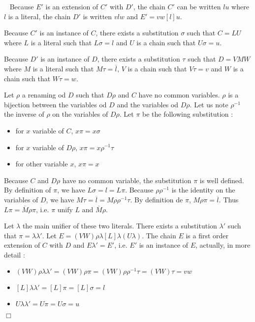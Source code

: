 \documentclass{article}
\newenvironment{preuve}{\noindent {\em Proof :}\ }{{\hfill
    $\Box$}\vspace{.5pc}} \newcommand{\sg}{\!\!<\!\!}
\begin{document}
\begin{preuve}
Because $E'$ is an extension of $C'$ with $D'$, the chain $C'$ can be written $lu$ where $l$ is a literal, the chain $D'$ is
written $vlw$ and $E'=vw[l]u$.

Because $C'$ is an instance of $C$, there exists a substitution $\sigma$ such that $C=LU$ where $L$ is a literal such that
$L\sigma=l$ and $U$ is a chain such that $U\sigma=u$.

Because $D'$ is an instance of $D$, there exists a substitution $\tau$ such that $D=VMW$ where $M$
is a literal such that $M\tau=\overline{l}$, $V$ is a chain such that $V\tau=v$ and $W$ is a  chain
such that $W\tau=w$.

Let $\rho$ a renaming od $D$ such that $D\rho$ and $C$ have no common variables. $\rho$ is a bijection between the variables
od $D$ and the variables od $D\rho$. Let us note $\rho^{-1}$ the inverse of $\rho$ on the variables of $D\rho$.
Let $\pi$ be the following substitution :
\begin{itemize}
\item for $x$ variable of $C$, $x\pi = x\sigma$
\item for $x$ variable of $D\rho$, $x\pi=x\rho^{-1}\tau$
\item for other variable $x$, $x\pi = x$
\end{itemize}

Because $C$ and $D\rho$ have no common variable, the substitution $\pi$ is well defined.
By definition of $\pi$,  we have $L\sigma=l=L\pi$. Because $\rho\rho^{-1}$ is the identity on the variables of $D$, 
we have $M\tau= \overline{l}= M\rho\rho^{-1}\tau$. By definition de $\pi$, $M\rho\pi = \overline{l}$.
Thus $L\pi = \overline{M}\rho\pi$, i.e. $\pi$ unify $L$ and $\overline{M}\rho$. 

Let $\lambda$ the main unifier of these two literals. There exists a substitution $\lambda'$ such that $\pi=\lambda\lambda'$.
Let $E =(VW)\rho\lambda[L]\lambda(U\lambda)$. The chain $E$ is a first order extension of $C$ with $D$ and $E\lambda'= E'$, i.e.
$E'$ is an instance of $E$, actually, in more detail :
\begin{itemize}
\item $(VW)\rho\lambda\lambda'=(VW)\rho\pi=(VW)\rho\rho^{-1}\tau=(VW)\tau=vw$
\item $[L]\lambda\lambda'=[L]\pi=[L]\sigma=l$
\item $U\lambda\lambda'=U\pi=U\sigma=u$
\end{itemize}

\end{preuve}
\end{document}
